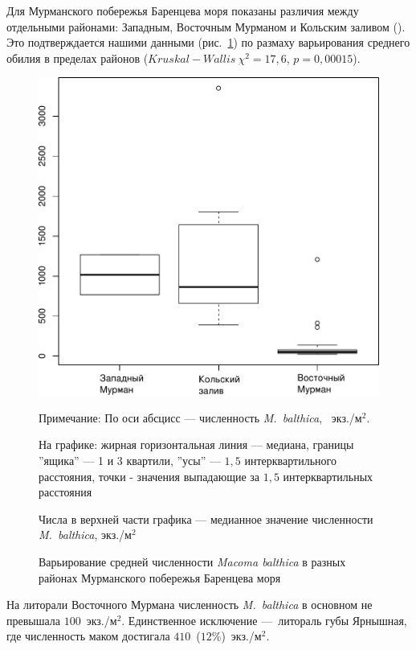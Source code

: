 Для Мурманского побережья Баренцева моря показаны различия между отдельными районами: Западным, Восточным Мурманом и Кольским заливом (\cite{Guryanova_Ushakov_1929, Guryanova_et_al_1930}). 
Это подтверждается нашими данными (рис.~\ref{ris:N_region_Barents}) по размаху варьирования среднего обилия в пределах районов ($Kruskal-Wallis\ \chi^2 = 17,6$, $p = 0,00015$).
%
	\begin{figure}[p]
	\begin{center}
		\includegraphics[height=0.5\textheight]{../All_N/Nmean_region_Barents1.pdf}
	\end{center}
	\caption{Варьирование средней численности {\it Macoma balthica} в разных районах Мурманского побережья Баренцева моря}
	{\footnotesize Примечание: По оси абсцисс --- численность {\it M.~balthica}, ~экз./м$^2$.

	На графике: жирная горизонтальная линия --- медиана, границы ''ящика'' --- 1 и 3 квартили, ''усы'' --- $1,5$ интерквартильного расстояния, точки - значения выпадающие за $1,5$ интерквартильных расстояния

Числа в верхней части графика --- медианное значение численности {\it M.~balthica}, экз./м$^2$}
	\label{ris:N_region_Barents}
	\end{figure}
%
На литорали Восточного Мурмана численность {\it M.~balthica} в основном не превышала $100$~экз./м$^2$. 
Единственное исключение ---\ литораль губы Ярнышная, где численность маком достигала $410$~($12$\%)~экз./м$^2$. 
